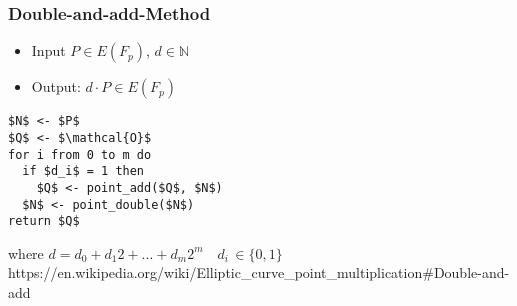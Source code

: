 \begin{frame}[fragile]
\frametitle{Double-and-add-Method}
\begin{itemize}
\item{Input $P \in E(F_p)$, $d \in \mathbb{N}$}\hspace{30pt}
\item{Output: $d\cdot P \in E(F_p)$}
\end{itemize}
\begin{lstlisting}[frame=single, mathescape=true]
$N$ <- $P$
$Q$ <- $\mathcal{O}$
for i from 0 to m do
  if $d_i$ = 1 then
    $Q$ <- point_add($Q$, $N$)
  $N$ <- point_double($N$)
return $Q$
\end{lstlisting}
where
$d = d_0 + d_1 2 + ... + d_m 2^m \quad d_i \, \in \{0,1\}$
\vfill
\tiny{https://en.wikipedia.org/wiki/Elliptic\_curve\_point\_multiplication\#Double-and-add}
\end{frame}
